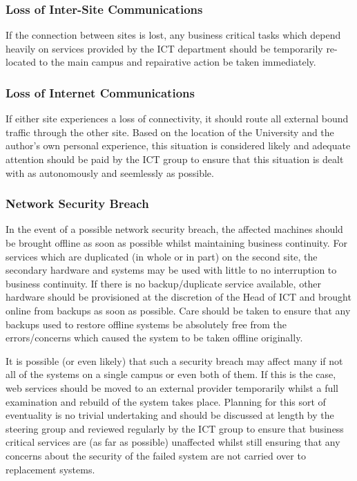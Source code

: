 \documentclass[a4paper, twoside]{article}
\begin{document}
\subsubsection{Loss of Inter-Site Communications}
If the connection between sites is lost, any business critical tasks which
depend heavily on services provided by the ICT department should be temporarily
re-located to the main campus and repairative action be taken immediately.

\subsubsection{Loss of Internet Communications}
If either site experiences a loss of connectivity, it should route all external
bound traffic through the other site. Based on the location of the University
and the author's own personal experience, this situation is considered likely
and adequate attention should be paid by the ICT group to ensure that this
situation is dealt with as autonomously and seemlessly as possible.

\subsubsection{Network Security Breach}
In the event of a possible network security breach, the affected machines should
be brought offline as soon as possible whilst maintaining business continuity.
For services which are duplicated (in whole or in part) on the second site, the
secondary hardware and systems may be used with little to no interruption to
business continuity. If there is no backup/duplicate service available, other
hardware should be provisioned at the discretion of the Head of ICT and brought
online from backups as soon as possible. Care should be taken to ensure that any
backups used to restore offline systems be absolutely free from the
errors/concerns which caused the system to be taken offline originally.

It is possible (or even likely) that such a security breach may affect many if
not all of the systems on a single campus or even both of them. If this is the
case, web services should be moved to an external provider temporarily whilst a
full examination and rebuild of the system takes place. Planning for this sort
of eventuality is no trivial undertaking and should be discussed at length by
the steering group and reviewed regularly by the ICT group to ensure that
business critical services are (as far as possible) unaffected whilst still
ensuring that any concerns about the security of the failed system are not
carried over to replacement systems.
\end{document}
